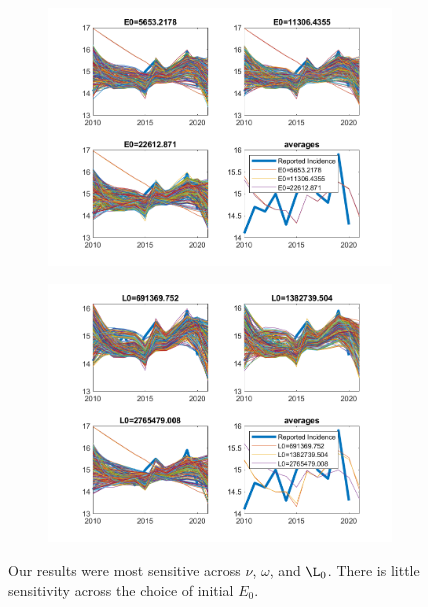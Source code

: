 \documentclass{article}
\begin{document}
\begin{figure}
		\begin{subfigure}[b]{0.475\textwidth}
			\centering
			\includegraphics[width=\textwidth]{Sensitivty_E0 Run 2.png}  
		\end{subfigure} 
		\hfill
		\begin{subfigure}[b]{0.475\textwidth}
			\centering
			\includegraphics[width=\textwidth]{Sensitivty_L0 Run 2.png}  
		\end{subfigure} 
		
		\caption{Our results were most sensitive across $\nu$, $\omega$, and $\L_0$. There is little sensitivity across the choice of initial $E_0$.}
		\label{fig:SensitivtyBigPlot}
	\end{figure}
	
\end{document}
